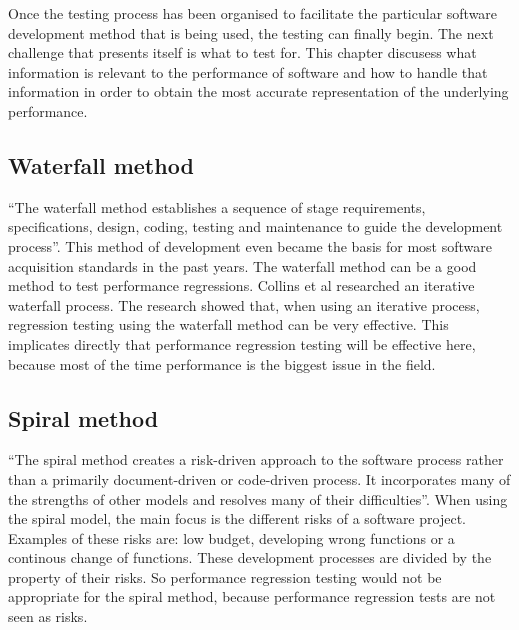 Once the testing process has been organised to facilitate the particular software development method that is being used, the testing can finally begin. The next challenge that presents itself is what to test for. This chapter discusess what information is relevant to the performance of software and how to handle that information in order to obtain the most accurate representation of the underlying performance.

\subsection{Waterfall method}
``The waterfall method establishes a sequence of stage requirements, specifications, design, coding, testing and maintenance to guide the development process''\cite{kang1989software}. This method of development even became the basis for most software acquisition standards in the past years\cite{boehm1988spiral}. The waterfall method can be a good method to test performance regressions. Collins et al researched an iterative waterfall process\cite{collins2010iterative}. The research showed that, when using an iterative process, regression testing using the waterfall method can be very effective. This implicates directly that performance regression testing will be effective here, because most of the time performance is the biggest issue in the field\cite{foo2010mining}.

\subsection{Spiral method}
``The spiral method creates a risk-driven approach to the software process rather than a primarily document-driven or code-driven process. It incorporates many of the strengths of other models and resolves many of their difficulties''\cite{boehm1988spiral}. When using the spiral model, the main focus is the different risks of a software project. Examples of these risks are: low budget, developing wrong functions or a continous change of functions. These development processes are divided by the property of their risks. So performance regression testing would not be appropriate for the spiral method, because performance regression tests are not seen as risks.

